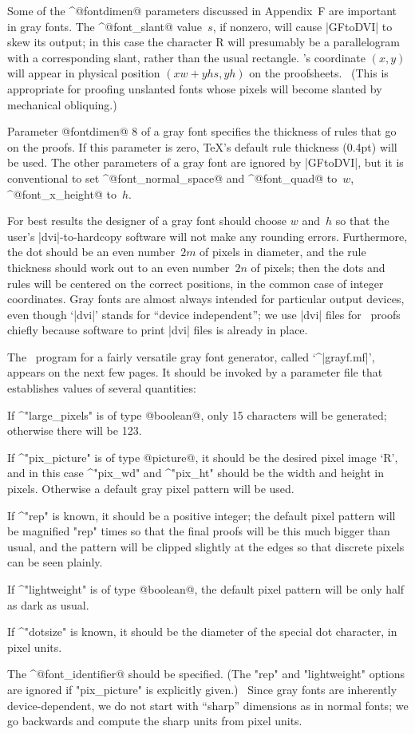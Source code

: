 Some of the ^@fontdimen@ parameters discussed in Appendix~F are important
in gray fonts. The ^@font\_slant@ value~$s$, if nonzero, will cause
|GFtoDVI| to skew its output; in this case the character {\manual R} will
presumably be a parallelogram with a corresponding slant, rather than the
usual rectangle. \MF's coordinate $(x,y)$ will appear in physical position
$(xw+yhs,yh)$ on the proofsheets. \ (This is appropriate for proofing unslanted
fonts whose pixels will become slanted by mechanical obliquing.)

Parameter @fontdimen@ 8 of a gray font specifies the thickness of rules
that go on the proofs. If this parameter is zero, \TeX's default
rule thickness (0.4\thinspace pt) will be used.
The other parameters of a gray font are ignored by |GFtoDVI|\null, but
it is conventional to set ^@font\_normal\_space@ and ^@font\_quad@ to~$w$,
^@font\_x\_height@ to~$h$.

For best results the designer of a gray font should choose $w$ and~$h$
so that the user's |dvi|-to-hardcopy software will not make any
rounding errors. Furthermore, the dot should be an even number~$2m$ of
pixels in diameter, and the rule thickness should work out to an
even number~$2n$ of pixels; then the dots and rules will be centered on
the correct positions, in the common case of integer coordinates. Gray fonts
are almost always intended for particular output devices, even though
`|dvi|' stands for ``device independent''; we use |dvi| files for \MF\
proofs chiefly because software to print |dvi| files is already in place.

The \MF\ program for a fairly versatile gray font generator, called
`^|grayf.mf|', appears on the next few pages. It should be invoked by a
parameter file that establishes values of several quantities:
\smallskip
\item\bull If ^"large\_pixels" is of type @boolean@, only 15 characters
will be generated; otherwise there will be 123.
\item\bull If ^"pix\_picture" is of type @picture@, it should be the
desired pixel image `{\manual R}', and in this case ^"pix\_wd" and
^"pix\_ht" should be the width and height in pixels. Otherwise a default
gray pixel pattern will be used.
\item\bull If ^"rep" is known, it should be a positive integer; the default
pixel pattern will be magnified "rep" times so that the final
proofs will be this much bigger than usual, and the pattern will be clipped
slightly at the edges so that discrete pixels can be seen plainly.
\item\bull If ^"lightweight" is of type @boolean@, the default pixel
pattern will be only half as dark as usual.
\item\bull If ^"dotsize" is known, it should be the diameter of the
special dot character, in pixel units.
\item\bull The ^@font\_identifier@ should be specified.
\smallskip\noindent
(The "rep" and "lightweight" options are ignored if "pix\_picture" is
explicitly given.) \
Since gray fonts are inherently device-dependent, we do not start
with ``sharp'' dimensions as in normal fonts; we go backwards and
compute the sharp units from pixel units.

